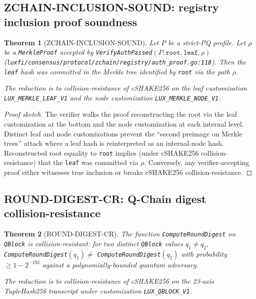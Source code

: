 \documentclass[11pt,a4paper]{article}
\newtheorem{theorem}{Theorem}
\begin{document}
\subsection{ZCHAIN-INCLUSION-SOUND: registry inclusion proof soundness}

\begin{theorem}[ZCHAIN-INCLUSION-SOUND]
\label{thm:zchain-inclusion}
Let $P$ be a strict-PQ profile. Let $\rho$ be a \texttt{MerkleProof}
accepted by \texttt{VerifyAuthPassed}$(P, \texttt{root}, \texttt{leaf},
\rho)$ (\texttt{luxfi/consensus/protocol/zchain/registry/auth\_proof.go:118}).
Then the \texttt{leaf} hash was committed in the Merkle tree
identified by \texttt{root} via the path $\rho$.

The reduction is to collision-resistance of cSHAKE256 on the leaf
customization \texttt{LUX\_MERKLE\_LEAF\_V1} and the node customization
\texttt{LUX\_MERKLE\_NODE\_V1}.
\end{theorem}

\begin{proof}[Proof sketch]
The verifier walks the proof reconstructing the root via the leaf
customization at the bottom and the node customization at each internal
level. Distinct leaf and node customizations prevent the
``second preimage on Merkle trees'' attack where a leaf hash is
reinterpreted as an internal-node hash. Reconstructed root equality to
\texttt{root} implies (under cSHAKE256 collision-resistance) that the
\texttt{leaf} was committed via $\rho$. Conversely, any verifier-accepting
proof either witnesses true inclusion or breaks cSHAKE256
collision-resistance.
\end{proof}

\subsection{ROUND-DIGEST-CR: Q-Chain digest collision-resistance}

\begin{theorem}[ROUND-DIGEST-CR]
\label{thm:round-digest-cr}
The function \texttt{ComputeRoundDigest} on \texttt{QBlock} is
collision-resistant: for two distinct \texttt{QBlock} values $q_1 \ne
q_2$, \texttt{ComputeRoundDigest}$(q_1) \ne$
\texttt{ComputeRoundDigest}$(q_2)$ with probability $\ge 1 - 2^{-192}$
against a polynomially-bounded quantum adversary.

The reduction is to collision-resistance of cSHAKE256 on the 23-axis
TupleHash256 transcript under customization \texttt{LUX\_QBLOCK\_V1}.
\end{theorem}
\end{document}
